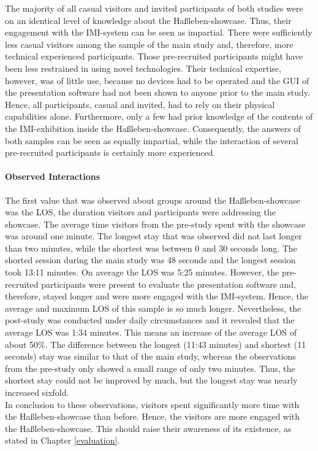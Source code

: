 The majority of all casual visitors and invited participants of both studies were on an identical level of knowledge about the Haßleben-showcase. Thus, their engagement with the \ac{IMI}-system can be seen as impartial. There were sufficiently less casual visitors among the sample of the main study and, therefore, more technical experienced participants. Those pre-recruited participants might have been less restrained in using novel technologies. Their technical expertise, however, was of little use, because no devices had to be operated and the \ac{GUI} of the presentation software had not been shown to anyone prior to the main study. Hence, all participants, casual and invited, had to rely on their physical capabilities alone. Furthermore, only a few had prior knowledge of the contents of the \ac{IMI}-exhibition inside the Haßleben-showcase. Consequently, the answers of both samples can be seen as equally impartial, while the interaction of several pre-recruited participants is certainly more experienced.


\paragraph{Observed Interactions}

The first value that was observed about groups around the Haßleben-showcase was the \ac{LOS}, the duration visitors and participants were addressing the showcase. The average time visitors from the pre-study spent with the showcase was around one minute. The longest stay that was observed did not last longer than two minutes, while the shortest was between 0 and 30 seconds long. The shorted session during the main study was 48 seconds and the longest session took 13:11 minutes. On average the \ac{LOS} was 5:25 minutes. However, the pre-recruited participants were present to evaluate the presentation software and, therefore, stayed longer and were more engaged with the \ac{IMI}-system. Hence, the average and maximum \ac{LOS} of this sample is so much longer. Nevertheless, the post-study was conducted under daily circumstances and it revealed that the average \ac{LOS} was 1:34 minutes. This means an increase of the average \ac{LOS} of about 50$\%$. The difference between the longest (11:43 minutes) and shortest (11 seconds) stay was similar to that of the main study, whereas the observations from the pre-study only showed a small range of only two minutes. Thus, the shortest stay could not be improved by much, but the longest stay was nearly increased sixfold.
\\
In conclusion to these observations, visitors spent significantly more time with the Haßleben-showcase than before. Hence, the visitors are more engaged with the Haßleben-showcase. This should raise their awareness of its existence, as stated in Chapter \ref{evaluation}.

